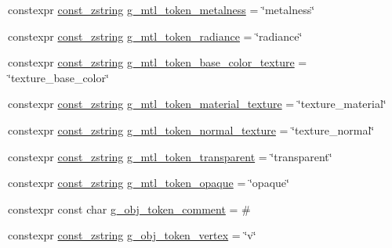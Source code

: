 \begin{DoxyCompactItemize}
\item 
constexpr \mbox{\hyperlink{namespacemage_abfd9206dc607ceb5d13ec68bf075a5c0}{const\+\_\+zstring}} \mbox{\hyperlink{namespacemage_1_1rendering_1_1loader_a17bfd9071437318629c792d38ca71808}{g\+\_\+mtl\+\_\+token\+\_\+metalness}} = \char`\"{}metalness\char`\"{}
\item 
constexpr \mbox{\hyperlink{namespacemage_abfd9206dc607ceb5d13ec68bf075a5c0}{const\+\_\+zstring}} \mbox{\hyperlink{namespacemage_1_1rendering_1_1loader_a5abd3a154bef9be04f7649447c50164a}{g\+\_\+mtl\+\_\+token\+\_\+radiance}} = \char`\"{}radiance\char`\"{}
\item 
constexpr \mbox{\hyperlink{namespacemage_abfd9206dc607ceb5d13ec68bf075a5c0}{const\+\_\+zstring}} \mbox{\hyperlink{namespacemage_1_1rendering_1_1loader_aa3dfb00f93883473d1ff397f0079364e}{g\+\_\+mtl\+\_\+token\+\_\+base\+\_\+color\+\_\+texture}} = \char`\"{}texture\+\_\+base\+\_\+color\char`\"{}
\item 
constexpr \mbox{\hyperlink{namespacemage_abfd9206dc607ceb5d13ec68bf075a5c0}{const\+\_\+zstring}} \mbox{\hyperlink{namespacemage_1_1rendering_1_1loader_a0bd068f0f246c00b56412b1bd7f70ed4}{g\+\_\+mtl\+\_\+token\+\_\+material\+\_\+texture}} = \char`\"{}texture\+\_\+material\char`\"{}
\item 
constexpr \mbox{\hyperlink{namespacemage_abfd9206dc607ceb5d13ec68bf075a5c0}{const\+\_\+zstring}} \mbox{\hyperlink{namespacemage_1_1rendering_1_1loader_afa917f0393f16f0fec40ad5d85aa65f9}{g\+\_\+mtl\+\_\+token\+\_\+normal\+\_\+texture}} = \char`\"{}texture\+\_\+normal\char`\"{}
\item 
constexpr \mbox{\hyperlink{namespacemage_abfd9206dc607ceb5d13ec68bf075a5c0}{const\+\_\+zstring}} \mbox{\hyperlink{namespacemage_1_1rendering_1_1loader_a2e86bdf00ab5d9721684b02b575a9df7}{g\+\_\+mtl\+\_\+token\+\_\+transparent}} = \char`\"{}transparent\char`\"{}
\item 
constexpr \mbox{\hyperlink{namespacemage_abfd9206dc607ceb5d13ec68bf075a5c0}{const\+\_\+zstring}} \mbox{\hyperlink{namespacemage_1_1rendering_1_1loader_a6f5ffd9bd3336fb8589c59a322ca2b1e}{g\+\_\+mtl\+\_\+token\+\_\+opaque}} = \char`\"{}opaque\char`\"{}
\item 
constexpr const char \mbox{\hyperlink{namespacemage_1_1rendering_1_1loader_a28d2091ac0bc8a30979e417ca93adfb9}{g\+\_\+obj\+\_\+token\+\_\+comment}} = \textquotesingle{}\#\textquotesingle{}
\item 
constexpr \mbox{\hyperlink{namespacemage_abfd9206dc607ceb5d13ec68bf075a5c0}{const\+\_\+zstring}} \mbox{\hyperlink{namespacemage_1_1rendering_1_1loader_af514e04ff45fa5aeddcb1cfc24fb77b1}{g\+\_\+obj\+\_\+token\+\_\+vertex}} = \char`\"{}v\char`\"{}

\end{DoxyCompactItemize}
